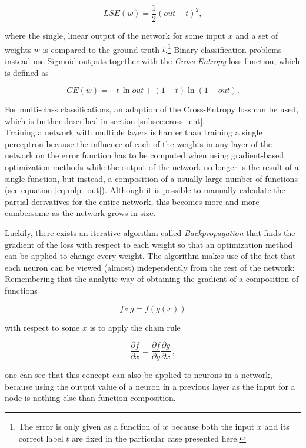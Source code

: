\[ LSE(w) = \frac{1}{2} \left ( out - t \right )^2, \]

\noindent where the single, linear output of the network for some input $x$ and a set of weights $w$ is compared to the ground truth $t$.\footnote{The error is only given as a function of $w$ because both the input $x$ and its correct label $t$ are fixed in the particular case presented here.} Binary classification problems instead use Sigmoid outputs together with the \textit{Cross-Entropy} loss function, which is defined as 

\[ CE(w) =  -t \, \ln out + (1 - t) \ln (1 - out). \]

\noindent For multi-class classifications, an adaption of the Cross-Entropy loss can be used, which is further described in section \ref{subsec:cross_ent}. \cite[pp. 232-236]{bishop_pattern}\\

\noindent Training a network with multiple layers is harder than training a single perceptron because the influence of each of the weights in any layer of the network on the error function has to be computed when using gradient-based optimization methods while the output of the network no longer is the result of a single function, but instead, a composition of a usually large number of functions (see equation \ref{eq:mlp_out}). Although it is possible to manually calculate the partial derivatives for the entire network, this becomes more and more cumbersome as the network grows in size.

Luckily, there exists an iterative algorithm called \textit{Backpropagation} \cite{backprop} that finds the gradient of the loss with respect to each weight so that an optimization method can be applied to change every weight. The algorithm makes use of the fact that each neuron can be viewed (almost) independently from the rest of the network: Remembering that the analytic way of obtaining the gradient of a composition of functions 

\[ f \circ g = f(g(x)) \]

\noindent with respect to some $x$ is to apply the chain rule

\[ \frac{\partial f}{\partial x} =\frac{\partial f}{\partial g} \frac{\partial g}{\partial x} \, , \]

\noindent one can see that this concept can also be applied to neurons in a network, because using the output value of a neuron in a previous layer as the input for a node is nothing else than function composition.

